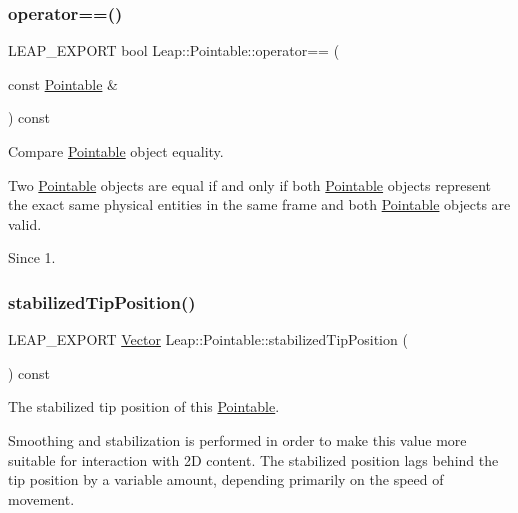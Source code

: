 \subsubsection{\texorpdfstring{operator==()}{operator==()}}
{\footnotesize\ttfamily L\+E\+A\+P\+\_\+\+E\+X\+P\+O\+RT bool Leap\+::\+Pointable\+::operator== (\begin{DoxyParamCaption}\item[{const \hyperlink{class_leap_1_1_pointable}{Pointable} \&}]{ }\end{DoxyParamCaption}) const}

Compare \hyperlink{class_leap_1_1_pointable}{Pointable} object equality.


\begin{DoxyCodeInclude}
\end{DoxyCodeInclude}


Two \hyperlink{class_leap_1_1_pointable}{Pointable} objects are equal if and only if both \hyperlink{class_leap_1_1_pointable}{Pointable} objects represent the exact same physical entities in the same frame and both \hyperlink{class_leap_1_1_pointable}{Pointable} objects are valid. \begin{DoxySince}{Since}
1. 
\end{DoxySince}
\mbox{\label{class_leap_1_1_pointable_a15bab44633dbee0ec54af03604e2b58b}} 
\subsubsection{\texorpdfstring{stabilized\+Tip\+Position()}{stabilizedTipPosition()}}
{\footnotesize\ttfamily L\+E\+A\+P\+\_\+\+E\+X\+P\+O\+RT \hyperlink{struct_leap_1_1_vector}{Vector} Leap\+::\+Pointable\+::stabilized\+Tip\+Position (\begin{DoxyParamCaption}{ }\end{DoxyParamCaption}) const}

The stabilized tip position of this \hyperlink{class_leap_1_1_pointable}{Pointable}.

Smoothing and stabilization is performed in order to make this value more suitable for interaction with 2D content. The stabilized position lags behind the tip position by a variable amount, depending primarily on the speed of movement.


